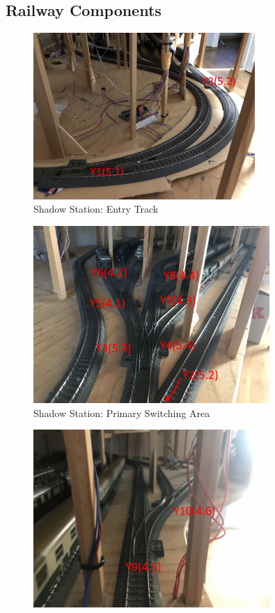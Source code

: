 \documentclass{scrreprt}
\begin{document}
\begin{appendices}
\section{Railway Components}
\begin{figure}[h!]
    \centering
    \includegraphics[width=0.75\textwidth]{ref/yard entry}
    \caption{Shadow Station: Entry Track}
\end{figure}
\begin{figure}[h!]
    \centering
    \includegraphics[width=0.8\textwidth]{ref/yard 2}
    \caption{Shadow Station: Primary Switching Area}
\end{figure}
\begin{figure}[h!]
    \centering
    \includegraphics[width=0.8\textwidth]{ref/yard 3}

\end{figure}
\end{appendices}
\end{document}
